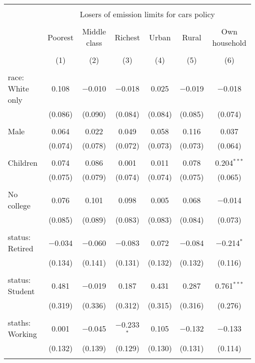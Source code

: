 
\begin{tabular}{@{\extracolsep{5pt}}lcccccc} 
\\[-1.8ex]\hline 
\hline \\[-1.8ex] 
 & \multicolumn{6}{c}{Losers of emission limits for cars policy} \\ 
\cline{2-7} 
\\[-1.8ex] & Poorest & Middle class & Richest & Urban & Rural & Own household \\ 
\\[-1.8ex] & (1) & (2) & (3) & (4) & (5) & (6)\\ 
\hline \\[-1.8ex] 
 race: White only & 0.108 & $-$0.010 & $-$0.018 & 0.025 & $-$0.019 & $-$0.018 \\ 
  & (0.086) & (0.090) & (0.084) & (0.084) & (0.085) & (0.074) \\ 
  & & & & & & \\ 
 Male & 0.064 & 0.022 & 0.049 & 0.058 & 0.116 & 0.037 \\ 
  & (0.074) & (0.078) & (0.072) & (0.073) & (0.073) & (0.064) \\ 
  & & & & & & \\ 
 Children & 0.074 & 0.086 & 0.001 & 0.011 & 0.078 & 0.204$^{***}$ \\ 
  & (0.075) & (0.079) & (0.074) & (0.074) & (0.075) & (0.065) \\ 
  & & & & & & \\ 
 No college & 0.076 & 0.101 & 0.098 & 0.005 & 0.068 & $-$0.014 \\ 
  & (0.085) & (0.089) & (0.083) & (0.083) & (0.084) & (0.073) \\ 
  & & & & & & \\ 
 status: Retired & $-$0.034 & $-$0.060 & $-$0.083 & 0.072 & $-$0.084 & $-$0.214$^{*}$ \\ 
  & (0.134) & (0.141) & (0.131) & (0.132) & (0.132) & (0.116) \\ 
  & & & & & & \\ 
 status: Student & 0.481 & $-$0.019 & 0.187 & 0.431 & 0.287 & 0.761$^{***}$ \\ 
  & (0.319) & (0.336) & (0.312) & (0.315) & (0.316) & (0.276) \\ 
  & & & & & & \\ 
 staths: Working & 0.001 & $-$0.045 & $-$0.233$^{*}$ & 0.105 & $-$0.132 & $-$0.133 \\ 
  & (0.132) & (0.139) & (0.129) & (0.130) & (0.131) & (0.114) \\ 
  & & & & & & \\ 

\end{tabular}
